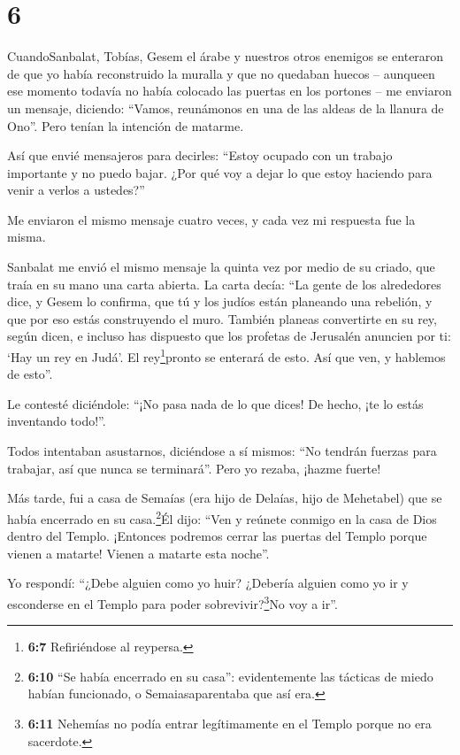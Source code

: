 \hypertarget{section-5}{%
\section{6}\label{section-5}}

 CuandoSanbalat, Tobías, Gesem el árabe y nuestros otros
enemigos se enteraron de que yo había reconstruido la muralla y que no
quedaban huecos -- aunqueen ese momento todavía no había colocado las
puertas en los portones --  me enviaron un mensaje,
diciendo: ``Vamos, reunámonos en una de las aldeas de la llanura de
Ono''. Pero tenían la intención de matarme.

 Así que envié mensajeros para decirles: ``Estoy ocupado con
un trabajo importante y no puedo bajar. ¿Por qué voy a dejar lo que
estoy haciendo para venir a verlos a ustedes?''

 Me enviaron el mismo mensaje cuatro veces, y cada vez mi
respuesta fue la misma.

 Sanbalat me envió el mismo mensaje la quinta vez por medio
de su criado, que traía en su mano una carta abierta.  La
carta decía: ``La gente de los alrededores dice, y Gesem lo confirma,
que tú y los judíos están planeando una rebelión, y que por eso estás
construyendo el muro. También planeas convertirte en su rey, según
dicen,  e incluso has dispuesto que los profetas de
Jerusalén anuncien por ti: `Hay un rey en Judá'. El rey\footnote{\textbf{6:7}
  Refiriéndose al reypersa.}pronto se enterará de esto. Así que ven, y
hablemos de esto''.

 Le contesté diciéndole: ``¡No pasa nada de lo que dices! De
hecho, ¡te lo estás inventando todo!''.

 Todos intentaban asustarnos, diciéndose a sí mismos: ``No
tendrán fuerzas para trabajar, así que nunca se terminará''. Pero yo
rezaba, ¡hazme fuerte!

 Más tarde, fui a casa de Semaías (era hijo de Delaías,
hijo de Mehetabel) que se había encerrado en su casa.\footnote{\textbf{6:10}
  ``Se había encerrado en su casa'': evidentemente las tácticas de miedo
  habían funcionado, o Semaiasaparentaba que así era.}Él dijo: ``Ven y
reúnete conmigo en la casa de Dios dentro del Templo. ¡Entonces podremos
cerrar las puertas del Templo porque vienen a matarte! Vienen a matarte
esta noche''.

 Yo respondí: ``¿Debe alguien como yo huir? ¿Debería
alguien como yo ir y esconderse en el Templo para poder
sobrevivir?\footnote{\textbf{6:11} Nehemías no podía entrar
  legítimamente en el Templo porque no era sacerdote.}No voy a ir''.

